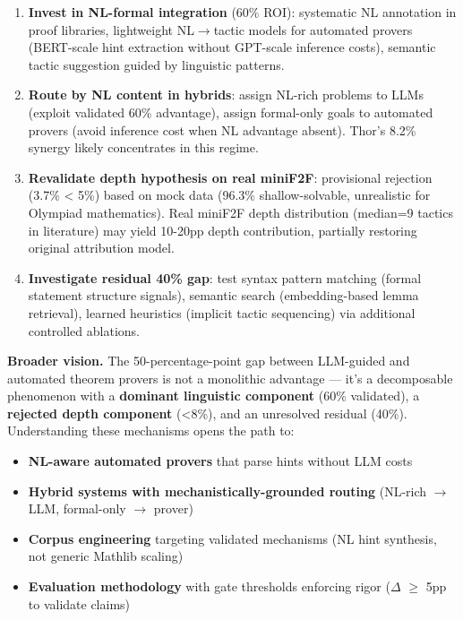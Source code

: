 \begin{enumerate}
\item \textbf{Invest in NL-formal integration} (60\% ROI): systematic NL annotation in proof libraries, lightweight NL$\rightarrow$tactic models for automated provers (BERT-scale hint extraction without GPT-scale inference costs), semantic tactic suggestion guided by linguistic patterns.

\item \textbf{Route by NL content in hybrids}: assign NL-rich problems to LLMs (exploit validated 60\% advantage), assign formal-only goals to automated provers (avoid inference cost when NL advantage absent). Thor's 8.2\% synergy likely concentrates in this regime.

\item \textbf{Revalidate depth hypothesis on real miniF2F}: provisional rejection (3.7\% < 5\%) based on mock data (96.3\% shallow-solvable, unrealistic for Olympiad mathematics). Real miniF2F depth distribution (median=9 tactics in literature) may yield 10-20pp depth contribution, partially restoring original attribution model.

\item \textbf{Investigate residual 40\% gap}: test syntax pattern matching (formal statement structure signals), semantic search (embedding-based lemma retrieval), learned heuristics (implicit tactic sequencing) via additional controlled ablations.
\end{enumerate}

\textbf{Broader vision.} The 50-percentage-point gap between LLM-guided and automated theorem provers is not a monolithic advantage --- it's a decomposable phenomenon with a \textbf{dominant linguistic component} (60\% validated), a \textbf{rejected depth component} (<8\%), and an unresolved residual (40\%). Understanding these mechanisms opens the path to:

\begin{itemize}
\item \textbf{NL-aware automated provers} that parse hints without LLM costs
\item \textbf{Hybrid systems with mechanistically-grounded routing} (NL-rich $\rightarrow$ LLM, formal-only $\rightarrow$ prover)
\item \textbf{Corpus engineering} targeting validated mechanisms (NL hint synthesis, not generic Mathlib scaling)
\item \textbf{Evaluation methodology} with gate thresholds enforcing rigor ($\Delta$ $\geq$ 5pp to validate claims)
\end{itemize}

